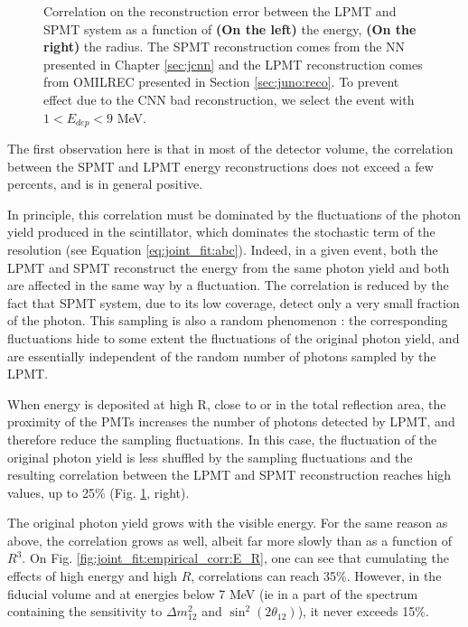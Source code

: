 \documentclass[../main.tex]{subfiles}
\begin{document}
\begin{figure}[ht]
\begin{subfigure}[t]{0.48\linewidth}
  \end{subfigure}
  \caption{Correlation on the reconstruction error between the LPMT and SPMT system as a function of \textbf{(On the left)} the energy, \textbf{(On the right)} the radius. The SPMT reconstruction comes from the NN presented in Chapter \ref{sec:jcnn} and the LPMT reconstruction comes from OMILREC presented in Section \ref{sec:juno:reco}. To prevent effect due to the CNN bad reconstruction, we select the event with $1 < E_{dep} < 9$ MeV.}
  \label{fig:joint_fit:empirical_corr:E_a_R}
\end{figure}

The first observation here is that in most of the detector volume, the correlation between the SPMT and LPMT energy reconstructions does not exceed a few percents, and is in general positive.

In principle, this correlation must be dominated by the fluctuations of the photon yield produced in the scintillator, which dominates the stochastic term of the resolution (see Equation \ref{eq:joint_fit:abc}). Indeed, in a given event, both the LPMT and SPMT reconstruct the energy from the same photon yield and both are affected in the same way by a fluctuation. The correlation is reduced by the fact that SPMT system, due to its low coverage, detect only a very small fraction of the photon. This sampling is also a random phenomenon : the corresponding fluctuations hide to some extent the fluctuations of the original photon yield, and are essentially independent of the random number of photons sampled by the LPMT.

When energy is deposited at high R, close to or in the total reflection area, the proximity of the PMTs increases the number of photons detected by LPMT, and therefore reduce the sampling fluctuations. In this case, the fluctuation of the original photon yield is less shuffled by the sampling fluctuations and the resulting correlation between the LPMT and SPMT reconstruction reaches high values, up to 25\% (Fig. \ref{fig:joint_fit:empirical_corr:E_a_R}, right).

The original photon yield grows with the visible energy. For the same reason as above, the correlation grows as well, albeit far more slowly than as a function of $R^3$. On Fig. \ref{fig:joint_fit:empirical_corr:E_R}, one can see that cumulating the effects of high energy and high $R$, correlations can reach 35\%. However, in the fiducial volume and at energies below 7 MeV (ie in a part of the spectrum containing the sensitivity to $\Delta m^2_{12}$ and $\sin^2(2 \theta_{12})$), it never exceeds 15\%.
\end{document}
